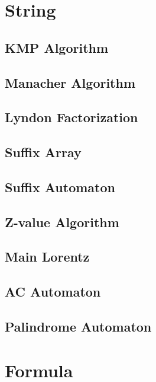 \documentclass{article}
\newcommand{\makegrid}{
\clearpage

\begin{center}
    \begin{tikzpicture}
        \draw[step=1, gray, thin] (0,0) grid (20.0, 25.0);
    \end{tikzpicture}
\end{center}
}
\begin{document}
\section{String}

\subsection{KMP Algorithm}


\subsection{Manacher Algorithm}


\subsection{Lyndon Factorization}


\subsection{Suffix Array}


\subsection{Suffix Automaton}


\subsection{Z-value Algorithm}


\subsection{Main Lorentz}


\subsection{AC Automaton}


\subsection{Palindrome Automaton}


\section{Formula}



\end{document}
